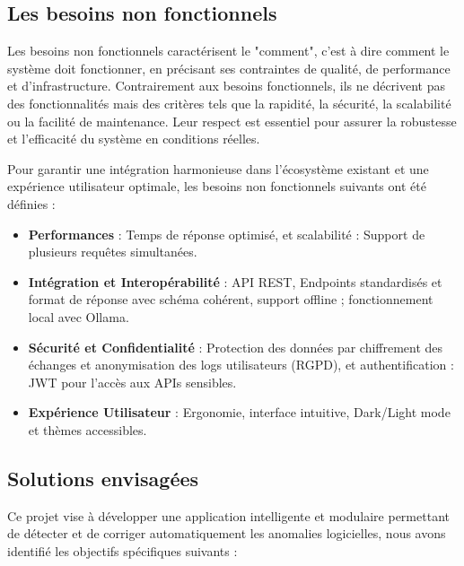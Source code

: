\documentclass[12pt,a4paper]{report}
\begin{document}
	\subsection{Les besoins non fonctionnels}
	
	Les besoins non fonctionnels caractérisent le "comment", c'est à dire comment le système doit fonctionner, en précisant ses contraintes de qualité, de performance et d’infrastructure. Contrairement aux besoins fonctionnels, ils ne décrivent pas des fonctionnalités mais des critères tels que la rapidité, la sécurité, la scalabilité ou la facilité de maintenance. Leur respect est essentiel pour assurer la robustesse et l’efficacité du système en conditions réelles.
	
	Pour garantir une intégration harmonieuse dans l’écosystème existant et une expérience utilisateur optimale, les besoins non fonctionnels suivants ont été définies :
	
	\begin{itemize}
		
		\item \textbf{Performances} : Temps de réponse optimisé, et scalabilité : Support de plusieurs requêtes simultanées.
		
		\item \textbf{Intégration et Interopérabilité} : API REST, Endpoints standardisés et format de réponse avec schéma cohérent, support offline ; fonctionnement local avec Ollama.
		
		\item \textbf{Sécurité et Confidentialité} : Protection des données par chiffrement des échanges et anonymisation des logs utilisateurs (RGPD), et authentification : JWT pour l’accès aux APIs sensibles.	
		
		\item \textbf{Expérience Utilisateur} : Ergonomie, interface intuitive, Dark/Light mode et thèmes accessibles.
		
		
	\end{itemize}
	
	\subsection{Solutions envisagées}
	
	Ce projet vise à développer une application intelligente et modulaire permettant de détecter et de corriger automatiquement les anomalies logicielles, nous avons identifié les objectifs spécifiques suivants :
	
\end{document}
